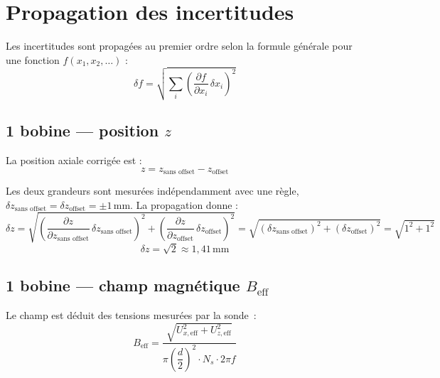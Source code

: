 \documentclass[a4paper,10pt]{article}
\begin{document}
\pagebreak


\section{Propagation des incertitudes}

Les incertitudes sont propagées au premier ordre selon la formule générale
pour une fonction $f(x_1, x_2, \ldots)$ :
\begin{equation}
  \delta f = \sqrt{\sum_i \left(\frac{\partial f}{\partial x_i}\,\delta x_i\right)^2}
  \label{eq:prop_generale}
\end{equation}

\subsection{1 bobine --- position \texorpdfstring{$z$}{z}}

La position axiale corrigée est :
\begin{equation}
  z = z_\text{sans offset} - z_\text{offset}
\end{equation}

Les deux grandeurs sont mesurées indépendamment avec une règle,
$\delta z_\text{sans offset} = \delta z_\text{offset} = \pm 1\,\text{mm}$.
La propagation donne :
\begin{equation}
  \delta z
  = \sqrt{\left(\frac{\partial z}{\partial z_\text{sans offset}}\,\delta z_\text{sans offset}\right)^2
          + \left(\frac{\partial z}{\partial z_\text{offset}}\,\delta z_\text{offset}\right)^2}
  = \sqrt{(\delta z_\text{sans offset})^2 + (\delta z_\text{offset})^2}
  = \sqrt{1^2 + 1^2}
\end{equation}
\begin{equation}
  \boxed{\delta z = \sqrt{2} \approx 1{,}41\,\text{mm}}
\end{equation}

\subsection{1 bobine --- champ magnétique \texorpdfstring{$B_\text{eff}$}{Beff}}

Le champ est déduit des tensions mesurées par la sonde~:
\begin{equation}
  B_\text{eff}
  = \frac{\sqrt{U_{x,\text{eff}}^2 + U_{z,\text{eff}}^2}}
         {\pi\!\left(\dfrac{d}{2}\right)^{\!2} \cdot N_s \cdot 2\pi f}
  \label{eq:B}
\end{equation}
\end{document}
